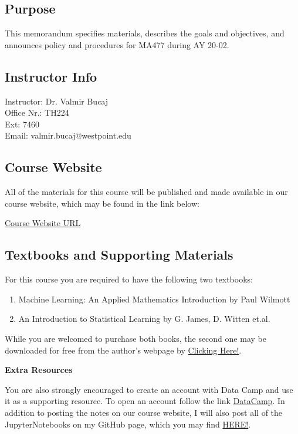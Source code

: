 \documentclass[11pt]{article}
\theoremstyle{plain}
\theoremstyle{definition}
\begin{document}
\subsection{Purpose}

This memorandum specifies materials, describes the goals and objectives, and announces policy and procedures for MA477 during AY 20-02.

\subsection{Instructor Info}

Instructor: Dr. Valmir Bucaj\\
Office Nr.: TH224\\
Ext: 7460\\
Email: valmir.bucaj$@$westpoint.edu

\subsection{Course Website}

All of the materials for this course will be published and made available in our course website, which may be found in the link below:
\vskip 12pt

\href{https://vbucaj.github.io/MA477-course/}{Course Website URL}


\subsection{Textbooks and Supporting Materials}

For this course you are required to have the following two textbooks:

\begin{enumerate}[(1)]
\item Machine Learning: An Applied Mathematics Introduction by Paul Wilmott
\item An Introduction to Statistical Learning by G. James, D. Witten et.al.
\end{enumerate}

While you are welcomed to purchase both books, the second one may be downloaded for free from the author's webpage by  \href{http://faculty.marshall.usc.edu/gareth-james/ISL/}{Clicking Here!}.
\vskip 12pt

{\bf Extra Resources}

You are also strongly encouraged to create an account with Data Camp and use it as a supporting resource. To open an account follow the link \href{https://www.datacamp.com/}{DataCamp}. In addition to posting the notes on our course website, I will also post all of the JupyterNotebooks on my GitHub page, which you may find  \href{https://github.com/vbucaj/lecture-notes}{HERE!}.
\end{document}
